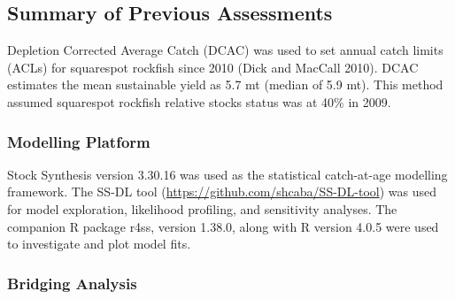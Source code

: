 \documentclass[11pt,
  english,
  a4paper,
]{article}
\begin{document}
\leavevmode\tagmcend\tagstructend


\hypertarget{summary-of-previous-assessments}{%
\subsection{Summary of Previous Assessments}\label{summary-of-previous-assessments}}

\leavevmode\tagmcend\tagstructend


Depletion Corrected Average Catch (DCAC) was used to set annual catch limits (ACLs) for squarespot rockfish since 2010 {(Dick and MacCall 2010)\leavevmode\tagmcend\tagstructend}. DCAC estimates the mean sustainable yield as 5.7 mt (median of 5.9 mt). This method assumed squarespot rockfish relative stocks status was at 40\% in 2009.

\leavevmode\tagmcend\tagstructend\par


\hypertarget{modelling-platform}{%
\subsubsection{Modelling Platform}\label{modelling-platform}}

\leavevmode\tagmcend\tagstructend


Stock Synthesis version 3.30.16 was used as the statistical catch-at-age modelling framework. The SS-DL tool ({\url{https://github.com/shcaba/SS-DL-tool}\leavevmode\tagmcend\tagstructend}) was used for model exploration, likelihood profiling, and sensitivity analyses. The companion R package r4ss, version 1.38.0, along with R version 4.0.5 were used to investigate and plot model fits.

\leavevmode\tagmcend\tagstructend\par


\hypertarget{bridging-analysis}{%
\subsubsection{Bridging Analysis}\label{bridging-analysis}}
\end{document}
